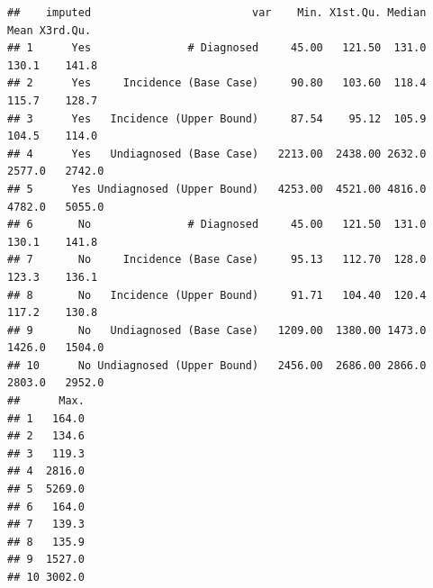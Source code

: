 \documentclass{article}\usepackage[]{graphicx}\usepackage[]{color}
\makeatletter
\newenvironment{kframe}{%
 \def\at@end@of@kframe{}%
 \ifinner\ifhmode%
  \def\at@end@of@kframe{\end{minipage}}%
  \begin{minipage}{\columnwidth}%
 \fi\fi%
 \def\FrameCommand##1{\hskip\@totalleftmargin \hskip-\fboxsep
 \colorbox{shadecolor}{##1}\hskip-\fboxsep
     \hskip-\linewidth \hskip-\@totalleftmargin \hskip\columnwidth}%
 \MakeFramed {\advance\hsize-\width
   \@totalleftmargin\z@ \linewidth\hsize
   \@setminipage}}%
 {\par\unskip\endMakeFramed%
 \at@end@of@kframe}
\newenvironment{knitrout}{}{} %
\makeatother
\begin{document}
\begin{knitrout}\footnotesize
{}\color{fgcolor}\begin{kframe}
\begin{verbatim}
##    imputed                         var    Min. X1st.Qu. Median   Mean X3rd.Qu.
## 1      Yes               # Diagnosed     45.00   121.50  131.0  130.1    141.8
## 2      Yes     Incidence (Base Case)     90.80   103.60  118.4  115.7    128.7
## 3      Yes   Incidence (Upper Bound)     87.54    95.12  105.9  104.5    114.0
## 4      Yes   Undiagnosed (Base Case)   2213.00  2438.00 2632.0 2577.0   2742.0
## 5      Yes Undiagnosed (Upper Bound)   4253.00  4521.00 4816.0 4782.0   5055.0
## 6       No               # Diagnosed     45.00   121.50  131.0  130.1    141.8
## 7       No     Incidence (Base Case)     95.13   112.70  128.0  123.3    136.1
## 8       No   Incidence (Upper Bound)     91.71   104.40  120.4  117.2    130.8
## 9       No   Undiagnosed (Base Case)   1209.00  1380.00 1473.0 1426.0   1504.0
## 10      No Undiagnosed (Upper Bound)   2456.00  2686.00 2866.0 2803.0   2952.0
##      Max.
## 1   164.0
## 2   134.6
## 3   119.3
## 4  2816.0
## 5  5269.0
## 6   164.0
## 7   139.3
## 8   135.9
## 9  1527.0
## 10 3002.0
\end{verbatim}
\end{kframe}
\end{knitrout}
\end{document}
